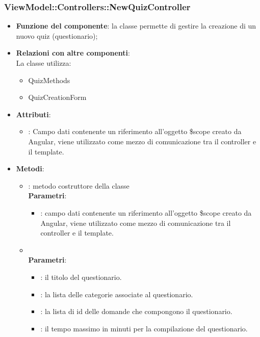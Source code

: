 \subsubsection{ViewModel::Controllers::NewQuizController}
\begin{itemize}
\item\textbf{Funzione del componente}: la classe permette di gestire la creazione di un nuovo quiz (questionario);
\item\textbf{Relazioni con altre componenti}: \\
La classe utilizza:
	\begin{itemize}
		\item QuizMethods
		\item QuizCreationForm
	\end{itemize}
\item\textbf{Attributi}:
	\begin{itemize}
		\item{}: Campo dati contenente un riferimento all'oggetto \$scope creato da Angular, viene utilizzato come mezzo di comunicazione tra il controller e il template.\\
	\end{itemize}
\item\textbf{Metodi}:
	\begin{itemize}
		\item{}: metodo costruttore della classe\\
		\textbf{Parametri}:
			\begin{itemize}
				\item{}: campo dati contenente un riferimento all’oggetto \$scope creato da Angular, viene utilizzato come mezzo di comunicazione tra il controller e il template.\\
			\end{itemize}
		\item{}\\
		\textbf{Parametri}:
			\begin{itemize}
				\item{}: il titolo del questionario.\\
				\item{}: la lista delle categorie associate al questionario.\\
				\item{}: la lista di id delle domande che compongono il questionario.\\
				\item{}: il tempo massimo in minuti per la compilazione del questionario.\\
			\end{itemize}
	\end{itemize}
\end{itemize}


